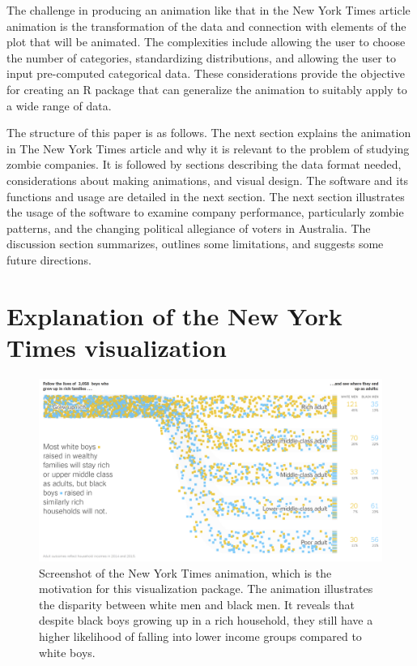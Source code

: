 The challenge in producing an animation like that in the New York Times article animation is the transformation of the data and connection with elements of the plot that will be animated. The complexities include allowing the user to choose the number of categories, standardizing distributions, and allowing the user to input pre-computed categorical data. These considerations provide the objective for creating an R package that can generalize the animation to suitably apply to a wide range of data.

The structure of this paper is as follows. The next section explains the animation in The New York Times article and why it is relevant to the problem of studying zombie companies. It is followed by sections describing the data format needed, considerations about making animations, and visual design. The software and its functions and usage are detailed in the next section. The next section illustrates the usage of the software to examine company performance, particularly zombie patterns, and the changing political allegiance of voters in Australia. The discussion section summarizes, outlines some limitations, and suggests some future directions.

\hypertarget{NYTvis}{%
\section{Explanation of the New York Times visualization}\label{NYTvis}}

\begin{figure}

{\centering \includegraphics[width=1\linewidth]{figures/NYT} 

}

\caption{Screenshot of the New York Times animation, which is the motivation for this visualization package. The animation illustrates the disparity between white men and black men. It reveals that despite black boys growing up in a rich household, they still have a higher likelihood of falling into lower income groups compared to white boys.}\label{fig:nyt}
\end{figure}

